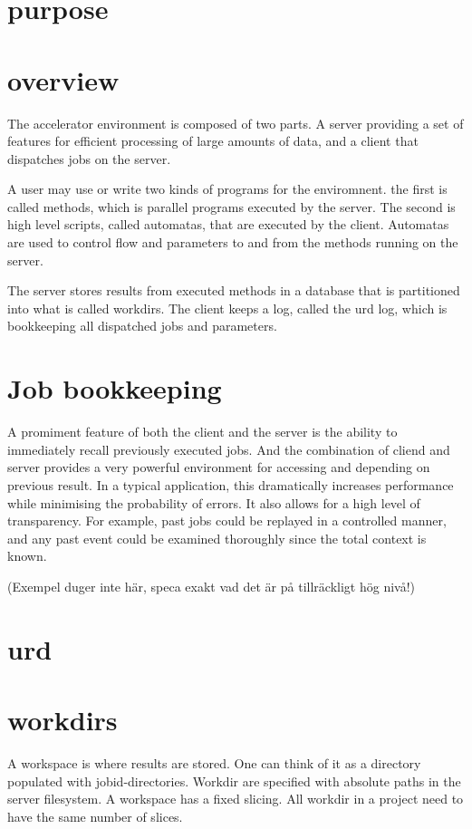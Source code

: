 
\section{purpose}




\section{overview}
The accelerator environment is composed of two parts.  A server
providing a set of features for efficient processing of large amounts
of data, and a client that dispatches jobs on the server.

A user may use or write two kinds of programs for the enviromnent.
the first is called methods, which is parallel programs executed by
the server.  The second is high level scripts, called automatas, that
are executed by the client.  Automatas are used to control flow and
parameters to and from the methods running on the server.

The server stores results from executed methods in a database that is
partitioned into what is called workdirs.  The client keeps a log,
called the urd log, which is bookkeeping all dispatched jobs and
parameters.

\section{Job bookkeeping}

A promiment feature of both the client and the server is the ability
to immediately recall previously executed jobs.  And the combination
of cliend and server provides a very powerful environment for
accessing and depending on previous result.  In a typical application,
this dramatically increases performance while minimising the
probability of errors.  It also allows for a high level of
transparency.  For example, past jobs could be replayed in a
controlled manner, and any past event could be examined thoroughly
since the total context is known.

(Exempel duger inte här, speca exakt vad det är på tillräckligt hög
nivå!)



\section{urd}





\section{workdirs}
A workspace is where results are stored.  One can think of it as a
directory populated with jobid-directories.
Workdir are specified with absolute paths in the server filesystem.
A workspace has a fixed slicing.
All workdir in a project need to have the same number of slices.



